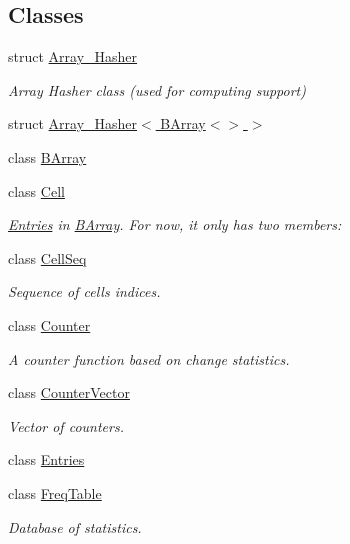 \subsection*{Classes}
\begin{DoxyCompactItemize}
\item 
struct \hyperlink{structbarry_1_1_array___hasher}{Array\+\_\+\+Hasher}
\begin{DoxyCompactList}\small\item\em Array Hasher class (used for computing support) \end{DoxyCompactList}\item 
struct \hyperlink{structbarry_1_1_array___hasher_3_01_b_array_3_4_01_4}{Array\+\_\+\+Hasher$<$ B\+Array$<$$>$ $>$}
\item 
class \hyperlink{classbarry_1_1_b_array}{B\+Array}
\item 
class \hyperlink{classbarry_1_1_cell}{Cell}
\begin{DoxyCompactList}\small\item\em \hyperlink{classbarry_1_1_entries}{Entries} in \hyperlink{classbarry_1_1_b_array}{B\+Array}. For now, it only has two members\+: \end{DoxyCompactList}\item 
class \hyperlink{classbarry_1_1_cell_seq}{Cell\+Seq}
\begin{DoxyCompactList}\small\item\em Sequence of cells indices. \end{DoxyCompactList}\item 
class \hyperlink{classbarry_1_1_counter}{Counter}
\begin{DoxyCompactList}\small\item\em A counter function based on change statistics. \end{DoxyCompactList}\item 
class \hyperlink{classbarry_1_1_counter_vector}{Counter\+Vector}
\begin{DoxyCompactList}\small\item\em Vector of counters. \end{DoxyCompactList}\item 
class \hyperlink{classbarry_1_1_entries}{Entries}
\item 
class \hyperlink{classbarry_1_1_freq_table}{Freq\+Table}
\begin{DoxyCompactList}\small\item\em Database of statistics. \end{DoxyCompactList}\item 

\end{DoxyCompactItemize}
